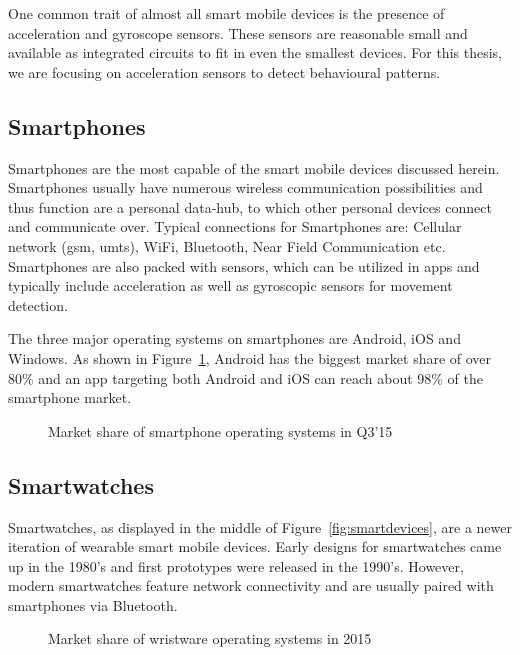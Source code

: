 One common trait of almost all smart mobile devices is the presence of acceleration and gyroscope sensors. These sensors are reasonable small and available as integrated circuits to fit in even the smallest devices. For this thesis, we are focusing on acceleration sensors to detect behavioural patterns.

\subsection{Smartphones}
Smartphones are the most capable of the smart mobile devices discussed herein. Smartphones usually have numerous wireless communication possibilities and thus function are a personal data-hub, to which other personal devices connect and communicate over. Typical connections for Smartphones are: Cellular network (\eg \acrshort{gsm}, \acrshort{umts}), WiFi, Bluetooth, Near Field Communication etc. Smartphones are also packed with sensors, which can be utilized in \glspl{app} and typically include acceleration as well as gyroscopic sensors for movement detection.

The three major operating systems on smartphones are Android, iOS and Windows. As shown in Figure~\ref{fig:smartphoneosmarketshare}, Android has the biggest market share of over 80\% and an \gls{app} targeting both Android and iOS can reach about 98\% of the smartphone market.

\begin{figure}
    \centering
    
    \caption{Market share of smartphone operating systems in Q3'15 \cite{gartner2015smartosmarketshare}}
    \label{fig:smartphoneosmarketshare}
\end{figure}

\subsection{Smartwatches}
Smartwatches, as displayed in the middle of Figure~\ref{fig:smartdevices}, are a newer iteration of wearable smart mobile devices. Early designs for smartwatches came up in the 1980's and first prototypes were released in the 1990's. However, modern smartwatches feature network connectivity and are usually paired with smartphones via Bluetooth.

\begin{figure}
    \centering
    
    \caption{Market share of wristware operating systems in 2015 \cite{idc2015wristmarketshare}}
    \label{fig:my_label}
\end{figure}

